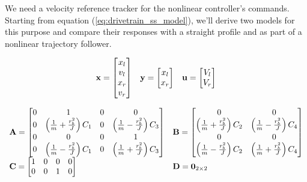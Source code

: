 We need a velocity \gls{reference} tracker for the nonlinear \gls{controller}'s
commands. Starting from equation (\ref{eq:drivetrain_ss_model}), we'll derive
two \glspl{model} for this purpose and compare their responses with a straight
profile and as part of a nonlinear trajectory follower.

\begin{equation*}
  \begin{array}{ccc}
    \mathbf{x} =
    \begin{bmatrix}
      x_l \\
      v_l \\
      x_r \\
      v_r
    \end{bmatrix} &
    \mathbf{y} =
    \begin{bmatrix}
      x_l \\
      x_r
    \end{bmatrix} &
    \mathbf{u} =
    \begin{bmatrix}
      V_l \\
      V_r
    \end{bmatrix}
  \end{array}
\end{equation*}

\begin{equation*}
  \begin{array}{ll}
    \mathbf{A} =
    \begin{bmatrix}
      0 & 1 & 0 & 0 \\
      0 & \left(\frac{1}{m} + \frac{r_b^2}{J}\right) C_1 & 0 & \left(\frac{1}{m} - \frac{r_b^2}{J}\right) C_3 \\
      0 & 0 & 0 & 1 \\
      0 & \left(\frac{1}{m} - \frac{r_b^2}{J}\right) C_1 & 0 & \left(\frac{1}{m} + \frac{r_b^2}{J}\right) C_3
    \end{bmatrix} &
    \mathbf{B} =
    \begin{bmatrix}
      0 & 0 \\
      \left(\frac{1}{m} + \frac{r_b^2}{J}\right) C_2 & \left(\frac{1}{m} - \frac{r_b^2}{J}\right) C_4 \\
      0 & 0 \\
      \left(\frac{1}{m} - \frac{r_b^2}{J}\right) C_2 & \left(\frac{1}{m} + \frac{r_b^2}{J}\right) C_4
    \end{bmatrix} \\
    \mathbf{C} =
    \begin{bmatrix}
      1 & 0 & 0 & 0 \\
      0 & 0 & 1 & 0 \\
    \end{bmatrix} &
    \mathbf{D} = \mathbf{0}_{2 \times 2}
  \end{array}
\end{equation*}

